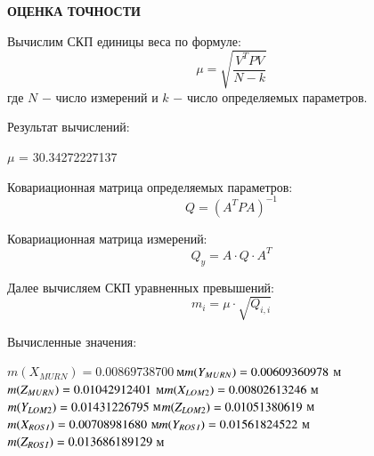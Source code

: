 \documentclass[a4paper]{article}
\begin{document}
\begin{newpage}
\begin{center}
    \large{\textbf{ОЦЕНКА ТОЧНОСТИ}}
\end{center}
 \par Вычислим СКП единицы веса по формуле:
 \begin{equation}
    \mu =\sqrt{\frac{V^{T}PV}{N-k}}
 \end{equation}
где $N$ $-$ число измерений и $k$ $-$ число определяемых параметров.
\par Результат вычислений:
\begin{center}
    $\mu$ = 30.34272227137
\end{center}
\par Ковариационная матрица определяемых параметров:
\begin{equation}
    Q = (A^TPA)^{-1}
\end{equation}
\par Ковариационная матрица измерений:
\begin{equation}
     Q_y = A\cdot{Q}\cdot{A^{T}}
\end{equation}
\par Далее вычисляем СКП уравненных превышений:
\begin{equation}
    m_i = \mu\cdot\sqrt{Q_{i,i}}
\end{equation}
\par Вычисленные значения:
\begin{center}
$m(X_{MURN}) = 0.00869738700 \ $м$\\
m(Y_{MURN}) = 0.00609360978 \ $м$\\
m(Z_{MURN}) = 0.01042912401 \ $м$\\
m(X_{LOM2}) = 0.00802613246 \ $м$\\
m(Y_{LOM2}) = 0.01431226795 \ $м$\\
m(Z_{LOM2}) = 0.01051380619 \ $м$\\
m(X_{ROSI}) = 0.00708981680 \ $м$\\
m(Y_{ROSI}) = 0.01561824522 \ $м$\\
m(Z_{ROSI}) = 0.013686189129 \ $м$ $   
\end{center}

\end{newpage}
\end{document}
